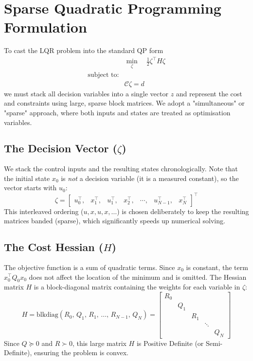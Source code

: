 \section{Sparse Quadratic Programming Formulation}

To cast the LQR problem into the standard QP form
\begin{align*}
	&\min_\zeta \quad \frac{1}{2}\zeta^\top H \zeta \\
	 \text{subject to:}& \\
	 &  \mathcal{C}\zeta = d
\end{align*}
we must stack all decision variables into a single vector $z$ and represent the cost and constraints using large, sparse block matrices. We adopt a "simultaneous" or "sparse" approach, where both inputs and states are treated as optimisation variables.

\subsection*{The Decision Vector ($\zeta$)}
We stack the control inputs and the resulting states chronologically. Note that the initial state $x_0$ is \emph{not} a decision variable (it is a measured constant), so the vector starts with $u_0$:
\begin{equation*}
	\zeta = \begin{bmatrix} u_0^\top, & x_1^\top, & u_1^\top, & x_2^\top, & \cdots, & u_{N-1}^\top, & x_N^\top \end{bmatrix}^\top
\end{equation*}
This interleaved ordering ($u, x, u, x, \dots$) is chosen deliberately to keep the resulting matrices banded (sparse), which significantly speeds up numerical solving.

\subsection*{The Cost Hessian ($H$)}
The objective function is a sum of quadratic terms. Since $x_0$ is constant, the term $x_0^\top Q_0 x_0$ does not affect the location of the minimum and is omitted. The Hessian matrix $H$ is a block-diagonal matrix containing the weights for each variable in $\zeta$:
\begin{equation*}
	H = \text{blkdiag}(R_0, \, Q_1, \, R_1, \, \dots, \, R_{N-1}, \, Q_N) = 
	\begin{bmatrix}
		R_0 & & & & \\
		& Q_1 & & & \\
		& & R_1 & & \\
		& & & \ddots & \\
		& & & & Q_N
	\end{bmatrix}
\end{equation*}
Since $Q \succeq 0$ and $R \succ 0$, this large matrix $H$ is Positive Definite (or Semi-Definite), ensuring the problem is convex.

